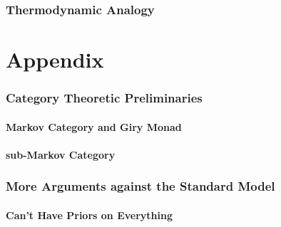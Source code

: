 \documentclass{article}
\begin{document}
	\section{Thermodynamic Analogy}
	
	

	\part*{Appendix}
	\appendix

	\section{Category Theoretic Preliminaries}
	\subsection{Markov Category and Giry Monad}
	
	\subsection{sub-Markov Category}
	
	\section{More Arguments against the Standard Model} %
	
	\subsection{Can't Have Priors on Everything}\label{sec:impossible-prior}
	
	
		
	
	
\end{document}
